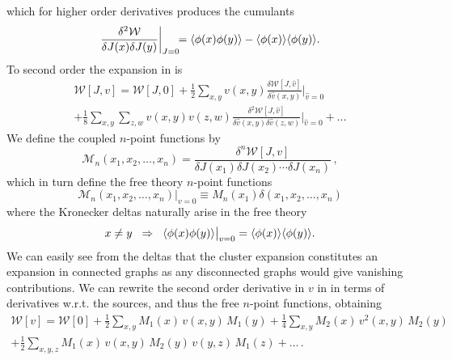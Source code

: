 %
which for higher order derivatives produces the cumulants
%
\begin{equation}
  \frac{\delta^2 \mathcal{W}}{\delta J(x) \delta J(y)} \bigg|_{J=\mathrlap{0}} 
    = \langle \phi(x) \phi(y) \rangle - \langle \phi(x) \rangle \langle \phi(y) \rangle.
\end{equation}
%
To second order the expansion in  is
%
\begin{multline} \label{eq:linked_cluster_2nd_order}
  \mathcal{W}[J, v] = \mathcal{W}[J,0]
    + \frac{1}{2} \sum_{x,y} v(x,y) \frac{\delta \mathcal{W}[J,\hat{v}]}{\delta \hat{v}(x,y)} \bigg|_{\hat{v}=0} \\
    + \frac{1}{8} \sum_{x,y} \sum_{z,w} v(x,y) v(z,w) \frac{\delta^2
      \mathcal{W}[J,\hat{v}]}{\delta \hat{v}(x,y) \delta \hat{v}(z,w)}
    \bigg|_{\hat{v}=0} + \dots
\end{multline}
%
We define the coupled $n$-point functions by
%
\begin{equation}
  \mathcal{M}_n(x_1, x_2, \dots, x_n) = \frac{\delta^n \mathcal{W}[J,v]}{\delta
    J(x_1) \delta J(x_2) \cdots \delta J(x_n)} \,,
\end{equation}
%
which in turn define the free theory $n$-point functions
%
\begin{equation}
   \mathcal{M}_n(x_1, x_2, \dots, x_n) \big|_{v = 0}
   \equiv M_n(x_1) \delta(x_1, x_2, \dots, x_n)
\end{equation}
%
where the Kronecker deltas naturally arise in the free theory
%
\begin{equation}
  x \neq y \hskip .2cm\Rightarrow\hskip .2cm
    \langle \phi(x) \phi(y) \rangle \big|_{v=0} = \langle \phi(x) \rangle \langle \phi(y)
    \rangle.
\end{equation}
%
We can easily see from the deltas that the cluster expansion constitutes an
expansion in connected graphs as any disconnected graphs would give
vanishing contributions. We can rewrite the second order derivative in $v$ in
 in terms of derivatives w.r.t. the sources,
and thus the free $n$-point functions, obtaining 
%
\begin{multline} \label{eq:free_energy_before_graph}
  \mathcal{W}[v] = \mathcal{W}[0] + \frac{1}{2} \sum_{x,y} M_1(x) \,v(x,y)\, M_1(y)
  + \frac{1}{4} \sum_{x,y} M_2(x) \,v^2(x,y)\, M_2(y)\\+ \frac{1}{2} \sum_{x,y,z}
  M_1(x) \,v(x,y)\, M_2(y) \,v(y,z)\, M_1(z) + \dots \,.
\end{multline}

